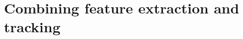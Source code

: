 \chapter{Combining feature extraction and tracking} %
\label{chap:combining_feature_extraction_and_tracking}

